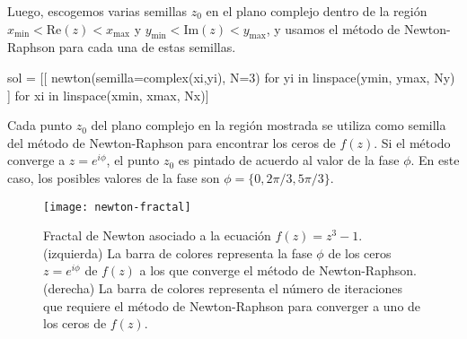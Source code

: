 \documentclass[../portafolio.tex]{subfiles}
\begin{document}
Luego, escogemos varias semillas $z_0$ en el plano complejo dentro de la
región $x_\text{min}<\text{Re}(z)<x_\text{max}$ y
$y_\text{min}<\text{Im}(z)<y_\text{max}$, y usamos el método de
Newton-Raphson para cada una de estas semillas.
\begin{pythoncode}
  sol = [[ newton(semilla=complex(xi,yi), N=3)
           for yi in linspace(ymin, ymax, Ny)
         ]
         for xi in linspace(xmin, xmax, Nx)]
\end{pythoncode}

Cada punto $z_0$ del plano complejo en la región mostrada se utiliza como semilla del método de Newton-Raphson para encontrar los ceros de $f(z)$. Si el método converge a $z=e^{i\phi}$, el punto $z_0$ es pintado de acuerdo al valor de la fase $\phi$. En este caso, los posibles valores de la fase son $\phi=\{0,2\pi/3,5\pi/3\}$.

\begin{figure}[ht!]
  \centering
  \texttt{[image: newton-fractal]}
  \caption{Fractal de Newton asociado a la ecuación $f(z)=z^3-1$. (izquierda) La barra de colores representa la fase $\phi$ de los ceros $z=e^{i\phi}$ de $f(z)$ a los que converge el método de Newton-Raphson. (derecha) La barra de colores representa el número de iteraciones que requiere el método de Newton-Raphson para converger a uno de los ceros de $f(z)$. }
  \label{fig:In_series_trapz}
\end{figure}
  

  
\end{document}
